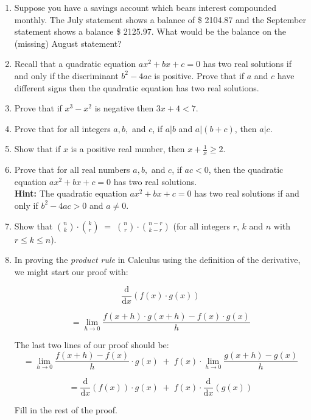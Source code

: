 \begin{enumerate}
\item Suppose you have a savings account which bears interest 
compounded monthly.  The July statement shows a balance of 
\$ 2104.87 and the September statement shows a balance \$ 2125.97.
What would be the balance on the (missing) August statement?
\item Recall that a quadratic equation $ax^2+bx+c=0$ has two real solutions
if and only if the discriminant $b^2-4ac$ is positive.  Prove that if 
$a$ and $c$ have different signs then the quadratic equation has two 
real solutions.
\item Prove that if $x^3-x^2$ is negative then $3x+4 < 7$.

\item Prove that for all integers $a,b,$ and $c$, if $a|b$ and $a|(b+c)$, then
$a|c$.

\item Show that if $x$ is a positive real number, then $x+\frac{1}{x} \geq 2$. 

\item Prove that for all real numbers $a,b,$ and $c$, if $ac<0$, then the quadratic
equation $ax^{2}+bx+c=0$ has two real solutions.\\
\textbf{Hint:} The quadratic equation $ax^{2}+bx+c=0$ has two
real solutions if and only if $b^{2}-4ac>0$ and $a\neq0$.

\item Show that $\binom{n}{k} \cdot \binom{k}{r} \; = \; \binom{n}{r} \cdot \binom{n-r}{k-r}$ (for all integers $r$, $k$ and $n$ with $r \leq k \leq n$). 

\item In proving the  \emph{product rule} in Calculus using the definition of the derivative, we might start our proof with:

\[
\frac{\mbox{d}}{\mbox{d}x} \left( f(x) \cdot g(x) \right)
\]

\[ = \lim_{h \longrightarrow 0} \frac{f(x+h) \cdot g(x+h) - f(x) \cdot g(x)}{h} \]

\noindent The last two lines of our proof should be:
\[
= \lim_{h \longrightarrow 0} \frac{f(x+h) - f(x)}{h} \cdot g(x) \; + \; f(x) \cdot \lim_{h \longrightarrow 0} \frac{g(x+h) - g(x)}{h}
\]

\[
= \frac{\mbox{d}}{\mbox{d}x}\left( f(x) \right) \cdot g(x) \; + \; f(x) \cdot \frac{\mbox{d}}{\mbox{d}x}\left( g(x) \right) 
\]

Fill in the rest of the proof.
\end{enumerate}